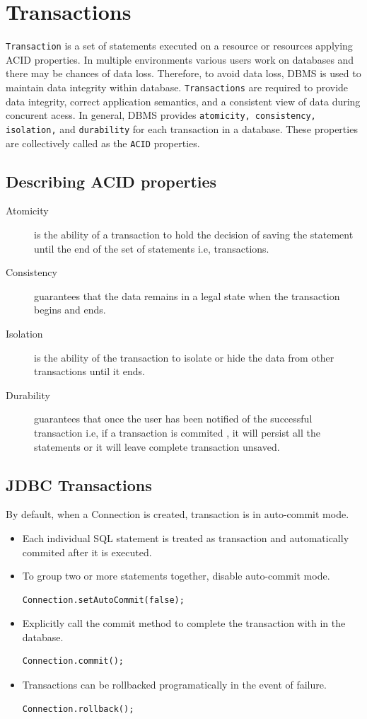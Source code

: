 \documentclass[11pt,a4paper]{article}
\begin{document}
\section*{Transactions}
\texttt{Transaction} is a set of statements executed on a resource or resources applying ACID properties. In multiple environments various users work on databases and there may be chances of data loss. Therefore, to avoid data loss, DBMS is used to maintain data integrity within database. \texttt{Transactions} are required to provide data integrity, correct application semantics, and a consistent view of data during concurent acess. In general, DBMS provides \texttt{atomicity, consistency, isolation,} and \texttt{durability} for each transaction in a database. These properties are collectively called as the \texttt{ACID} properties.

\subsection*{Describing ACID properties}
\begin{description}
    \item[Atomicity] is the ability of a transaction to hold the decision of saving the statement until the end of the set of statements i.e, transactions.
    \item[Consistency] guarantees that the data remains in a legal state when the transaction begins and ends.
    \item[Isolation] is the ability of the transaction to isolate or hide the data from other transactions until it ends.
    \item[Durability] guarantees that once the user has been notified of the successful transaction i.e, if a transaction is commited , it will persist all the statements or it will leave complete transaction unsaved.
\end{description}
\subsection*{JDBC Transactions}
By default, when a Connection is created, transaction is in auto-commit mode.
\begin{itemize}
\item Each individual SQL statement is treated as transaction and automatically commited after it is executed.
\item To group two or more statements together, disable auto-commit mode.
\begin{lstlisting}[numbers=none]
Connection.setAutoCommit(false);
\end{lstlisting}
\item Explicitly call the commit method to complete the transaction with in the database.
\begin{lstlisting}[numbers=none]
Connection.commit();
\end{lstlisting}
\item Transactions can be rollbacked programatically in the event of failure.
\begin{lstlisting}[numbers=none]
Connection.rollback();
\end{lstlisting}
  \end{itemize}
\end{document}
